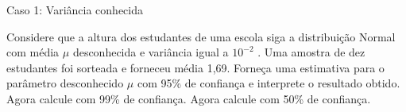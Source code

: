 \begin{frame}{Caso 1: Variância conhecida}
    \begin{exemplo}
        Considere que a altura dos estudantes de uma escola siga a distribuição Normal com média $\mu$ desconhecida e variância igual a $10^{-2}$ .
         Uma amostra de dez estudantes foi sorteada e forneceu média 1,69. 
         Forneça uma estimativa para o parâmetro desconhecido $\mu$ \pause com 95\% de confiança e interprete o resultado obtido. 
         \pause Agora calcule com 99\% de confiança. \pause Agora calcule com 50\% de confiança. 
    \end{exemplo}
\end{frame}












